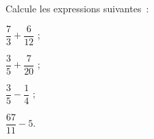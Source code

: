 \begin{methode*1}
  \exercice
Calcule les expressions suivantes :
\begin{colenumerate}{4} 
 \item $\dfrac{7}{3} + \dfrac{6}{12}$ ;
 \item $\dfrac{3}{5} + \dfrac{7}{20}$ ;
 \item $\dfrac{3}{5} - \dfrac{1}{4}$ ;
 \item $\dfrac{67}{11} - 5$.
 \end{colenumerate}

 \end{methode*1}

